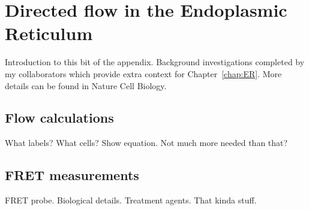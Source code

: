 
\chapter{Directed flow in the Endoplasmic Reticulum}
Introduction to this bit of the appendix. 
Background investigations completed by my collaborators which provide extra context for Chapter~\ref{chap:ER}. 
More details can be found in Nature Cell Biology. 

\section{Flow calculations} \label{appn:flow}
What labels? What cells?
Show equation. Not much more needed than that? 

\section{FRET measurements} \label{appn:fret}
FRET probe. Biological details. Treatment agents. That kinda stuff. 